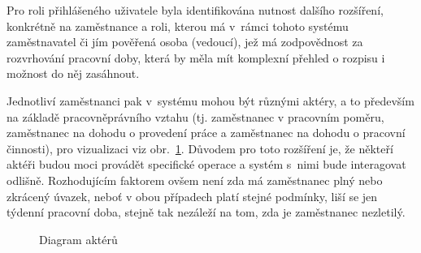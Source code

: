 \documentclass[twoside]{ctuthesis}
\begin{document}
Pro roli přihlášeného uživatele byla identifikována nutnost dalšího rozšíření, konkrétně na zaměstnance a roli, kterou má v~rámci tohoto systému za\-měst\-na\-va\-tel či jím pověřená osoba (vedoucí), jež má zodpovědnost za rozvrhování pracovní doby, která by měla mít komplexní přehled o rozpisu i možnost do něj zasáhnout.

Jednotliví zaměstnanci pak v~systému mohou být různými aktéry, a to především na základě pracovněprávního vztahu (tj. zaměstnanec v pracovním poměru, zaměstnanec na dohodu o provedení práce a zaměstnanec na dohodu o pracovní činnosti), pro vizualizaci viz obr.~\ref{fig:userroles}. Důvodem pro toto rozšíření je, že někteří aktéři budou moci provádět specifické operace a systém s~nimi bude interagovat odlišně. Rozhodujícím faktorem ovšem není zda má zaměstnanec plný nebo zkrácený úvazek, neboť v obou případech platí stejné podmínky, liší se jen týdenní pracovní doba, stejně tak nezáleží na tom, zda je zaměstnanec nezletilý.

\begin{figure}[h]
	
	\caption{Diagram aktérů}
	\label{fig:userroles}
\end{figure}

%
%
\end{document}
